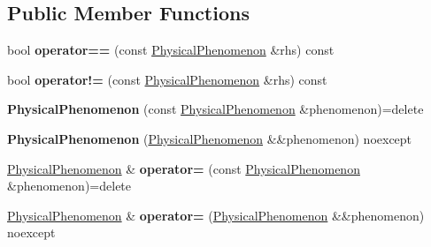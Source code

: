 \subsection*{Public Member Functions}
\begin{DoxyCompactItemize}
\item 
\mbox{\label{classomexmeta_1_1PhysicalPhenomenon_a1c3322453b3c6831668ffa98d9f4b6af}} 
bool {\bfseries operator==} (const \hyperlink{classomexmeta_1_1PhysicalPhenomenon}{Physical\+Phenomenon} \&rhs) const
\item 
\mbox{\label{classomexmeta_1_1PhysicalPhenomenon_a2c726263714e31c7c19d6e73c2c593f8}} 
bool {\bfseries operator!=} (const \hyperlink{classomexmeta_1_1PhysicalPhenomenon}{Physical\+Phenomenon} \&rhs) const
\item 
\mbox{\label{classomexmeta_1_1PhysicalPhenomenon_ad823dad75504adb78975c810e5f1ff94}} 
{\bfseries Physical\+Phenomenon} (const \hyperlink{classomexmeta_1_1PhysicalPhenomenon}{Physical\+Phenomenon} \&phenomenon)=delete
\item 
\mbox{\label{classomexmeta_1_1PhysicalPhenomenon_aeb95aedf1756ded154ec6753108a691e}} 
{\bfseries Physical\+Phenomenon} (\hyperlink{classomexmeta_1_1PhysicalPhenomenon}{Physical\+Phenomenon} \&\&phenomenon) noexcept
\item 
\mbox{\label{classomexmeta_1_1PhysicalPhenomenon_aac3920bfe9bf16e071ebdd8ed4fabe2f}} 
\hyperlink{classomexmeta_1_1PhysicalPhenomenon}{Physical\+Phenomenon} \& {\bfseries operator=} (const \hyperlink{classomexmeta_1_1PhysicalPhenomenon}{Physical\+Phenomenon} \&phenomenon)=delete
\item 
\mbox{\label{classomexmeta_1_1PhysicalPhenomenon_af15355b4c2a361b4b02dca02d3877aed}} 
\hyperlink{classomexmeta_1_1PhysicalPhenomenon}{Physical\+Phenomenon} \& {\bfseries operator=} (\hyperlink{classomexmeta_1_1PhysicalPhenomenon}{Physical\+Phenomenon} \&\&phenomenon) noexcept
\item 
\mbox{\label{classomexmeta_1_1PhysicalPhenomenon_aa140516da97b03960175f9bc04ecf865}} 

\end{DoxyCompactItemize}
